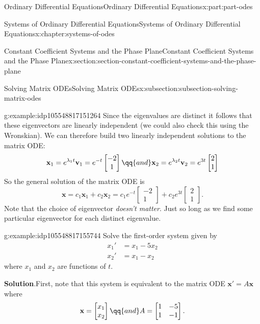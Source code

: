 \documentclass[twoside,10pt,]{book}
\newcommand{\blocktitlefont}{\relax}
\numberwithin{equation}{part}
\renewcommand{\vec}[1]{\mathbf{#1}}
\newcommand{\amp}{&}
\begin{document}
\begin{partptx}{Ordinary Differential Equations}{}{Ordinary Differential Equations}{}{}{x:part:part-odes}
\begin{chapterptx}{Systems of Ordinary Differential Equations}{}{Systems of Ordinary Differential Equations}{}{}{x:chapter:systems-of-odes}
\begin{sectionptx}{Constant Coefficient Systems and the Phase Plane}{}{Constant Coefficient Systems and the Phase Plane}{}{}{x:section:section-constant-coefficient-systems-and-the-phase-plane}
\begin{subsectionptx}{Solving Matrix ODEs}{}{Solving Matrix ODEs}{}{}{x:subsection:subsection-solving-matrix-odes}
\begin{example}{}{g:example:idp105548817151264}
Since the eigenvalues are distinct it follows that these eigenvectors are linearly independent (we could also check this using the Wronskian). We can therefore build two linearly independent solutions to the matrix ODE:%
\begin{equation*}
\vec{x}_{1} = e^{\lambda_{1}t}\vec{v}_{1} = e^{-t}\begin{bmatrix}-2\\1\end{bmatrix}\qq{and} \vec{x}_{2} = e^{\lambda_{2}t}\vec{v}_{2} = e^{3t}\begin{bmatrix}2\\1\end{bmatrix}
\end{equation*}
So the general solution of the matrix ODE is%
\begin{equation*}
\vec{x} = c_{1}\vec{x}_{1} + c_{2}\vec{x}_{2} = c_{1}e^{-t}\begin{bmatrix}-2\\1\end{bmatrix} + c_{2}e^{3t}\begin{bmatrix}2\\1\end{bmatrix}.
\end{equation*}
Note that the choice of eigenvector \emph{doesn't matter}. Just so long as we find some particular eigenvector for each distinct eigenvalue.%
\end{example}
\begin{example}{}{g:example:idp105548817155744}%
Solve the first-order system given by%
\begin{align*}
x_{1}' \amp = x_{1} - 5x_{2}\\
x_{2}' \amp = x_{1} - x_{2}
\end{align*}
where \(x_{1}\) and \(x_{2}\) are functions of \(t\).%
\par\smallskip%
\noindent\textbf{\blocktitlefont Solution}.\hypertarget{g:solution:idp105548817158176}{}\quad{}First, note that this system is equivalent to the matrix ODE \(\vec{x}' = A\vec{x}\) where%
\begin{equation*}
\vec{x} = \begin{bmatrix}x_{1} \\ x_{2}\end{bmatrix}\qq{and} A = \begin{bmatrix}1 \amp  -5 \\ 1 \amp  -1\end{bmatrix}.
\end{equation*}

\end{example}
\end{subsectionptx}
\end{sectionptx}
\end{chapterptx}
\end{partptx}
\end{document}
